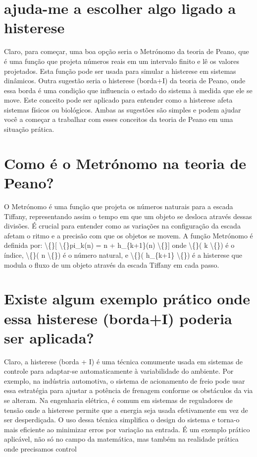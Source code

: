 \documentclass[11pt,a4paper]{article}
\begin{document}
\section{ajuda-me a escolher algo ligado a histerese}
Claro, para começar, uma boa opção seria o Metrónomo da teoria de Peano, que é uma função que projeta números reais em um intervalo finito e lê os valores projetados. Esta função pode ser usada para simular a histerese em sistemas dinâmicos. Outra sugestão seria o histerese (borda+I) da teoria de Peano, onde essa borda é uma condição que influencia o estado do sistema à medida que ele se move. Este conceito pode ser aplicado para entender como a histerese afeta sistemas físicos ou biológicos. Ambas as sugestões são simples e podem ajudar você a começar a trabalhar com esses conceitos da teoria de Peano em uma situação prática.

\section{Como é o Metrónomo na teoria de Peano?}
O Metrónomo é uma função que projeta os números naturais para a escada Tiffany, representando assim o tempo em que um objeto se desloca através dessas divisões. É crucial para entender como as variações na configuração da escada afetam o ritmo e a precisão com que os objetos se movem. A função Metrónomo é definida por: \textbackslash\{\}[ \textbackslash\{\}pi\_k(n) = n + h\_\{k+1\}(n) \textbackslash\{\}] onde \textbackslash\{\}( k \textbackslash\{\}) é o índice, \textbackslash\{\}( n \textbackslash\{\}) é o número natural, e \textbackslash\{\}( h\_\{k+1\} \textbackslash\{\}) é a histerese que modula o fluxo de um objeto através da escada Tiffany em cada passo.

\section{Existe algum exemplo prático onde essa histerese (borda+I) poderia ser aplicada?}
Claro, a histerese (borda + I) é uma técnica comumente usada em sistemas de controle para adaptar-se automaticamente à variabilidade do ambiente. Por exemplo, na indústria automotiva, o sistema de acionamento de freio pode usar essa estratégia para ajustar a potência de frenagem conforme os obstáculos da via se alteram. Na engenharia elétrica, é comum em sistemas de reguladores de tensão onde a histerese permite que a energia seja usada efetivamente em vez de ser desperdiçada. O uso dessa técnica simplifica o design do sistema e torna-o mais eficiente ao minimizar erros por variação na entrada. É um exemplo prático aplicável, não só no campo da matemática, mas também na realidade prática onde precisamos control
\end{document}
